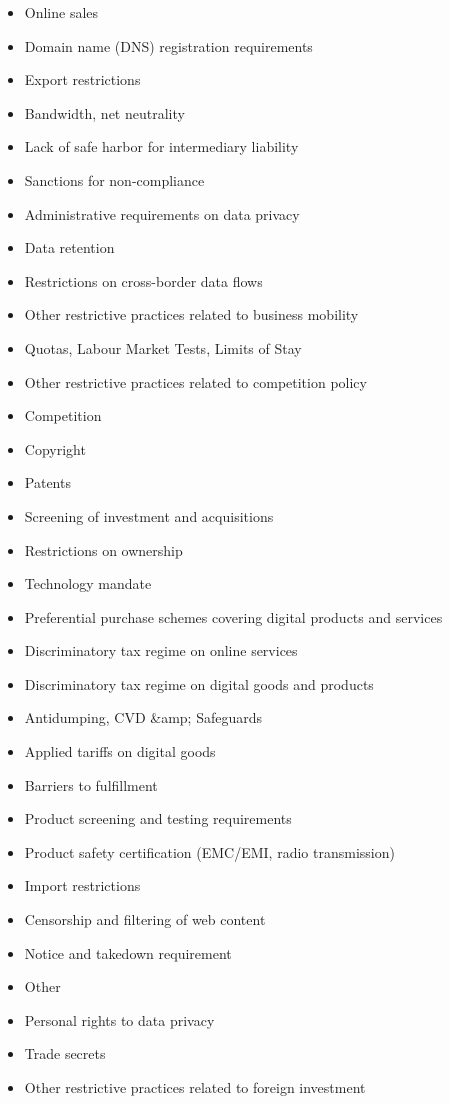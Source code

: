\documentclass[11pt]{article}
\begin{document}
\begin{itemize}
\item Online sales
\item Domain name (DNS) registration requirements
\item Export restrictions
\item Bandwidth, net neutrality
\item Lack of safe harbor for intermediary liability
\item Sanctions for non-compliance
\item Administrative requirements on data privacy
\item Data retention
\item Restrictions on cross-border data flows
\item Other restrictive practices related to business mobility
\item Quotas, Labour Market Tests, Limits of Stay
\item Other restrictive practices related to competition policy
\item Competition
\item Copyright
\item Patents
\item Screening of investment and acquisitions
\item Restrictions on ownership
\item Technology mandate
\item Preferential purchase schemes covering digital products and services
\item Discriminatory tax regime on online services
\item Discriminatory tax regime on digital goods and products
\item Antidumping, CVD \&amp; Safeguards
\item Applied tariffs on digital goods
\item Barriers to fulfillment
\item Product screening and testing requirements
\item Product safety certification (EMC/EMI, radio transmission)
\item Import restrictions
\item Censorship and filtering of web content
\item Notice and takedown requirement
\item Other
\item Personal rights to data privacy
\item Trade secrets
\item Other restrictive practices related to foreign investment

\end{itemize}
\end{document}
